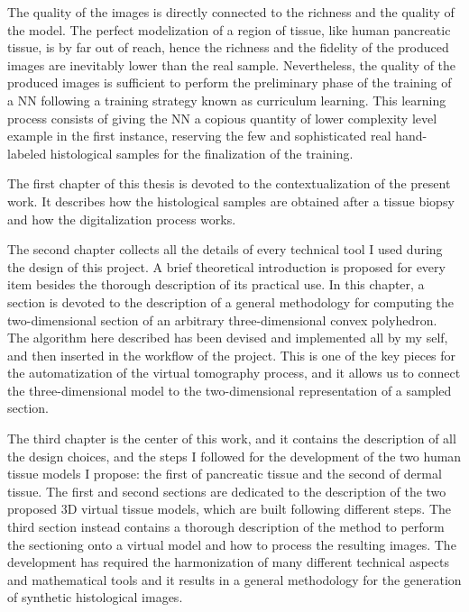 The quality of the images is directly connected to the richness and the quality of the model. The perfect modelization of a region of tissue, like human pancreatic tissue, is by far out of reach, hence the richness and the fidelity of the produced images are inevitably lower than the real sample. Nevertheless, the quality of the produced images is sufficient to perform the preliminary phase of the training of a NN following a training strategy known as curriculum learning. This learning process consists of giving the NN a copious quantity of lower complexity level example in the first instance, reserving the few and sophisticated real hand-labeled histological samples for the finalization of the training.

The first chapter of this thesis is devoted to the contextualization of the present work. It describes how the histological samples are obtained after a tissue biopsy and how the digitalization process works.

The second chapter collects all the details of every technical tool I used during the design of this project. A brief theoretical introduction is proposed for every item besides the thorough description of its practical use. In this chapter, a section is devoted to the description of a general methodology for computing the two-dimensional section of an arbitrary three-dimensional convex polyhedron. The algorithm here described has been devised and implemented all by my self, and then inserted in the workflow of the project. This is one of the key pieces for the automatization of the virtual tomography process, and it allows us to connect the three-dimensional model to the two-dimensional representation of a sampled section.

The third chapter is the center of this work, and it contains the description of all the design choices, and the steps I followed for the development of the two human tissue models I propose: the first of pancreatic tissue and the second of dermal tissue. The first and second sections are dedicated to the description of the two proposed 3D virtual tissue models, which are built following different steps. The third section instead contains a thorough description of the method to perform the sectioning onto a virtual model and how to process the resulting images. The development has required the harmonization of many different technical aspects and mathematical tools and it results in a general methodology for the generation of synthetic histological images.

